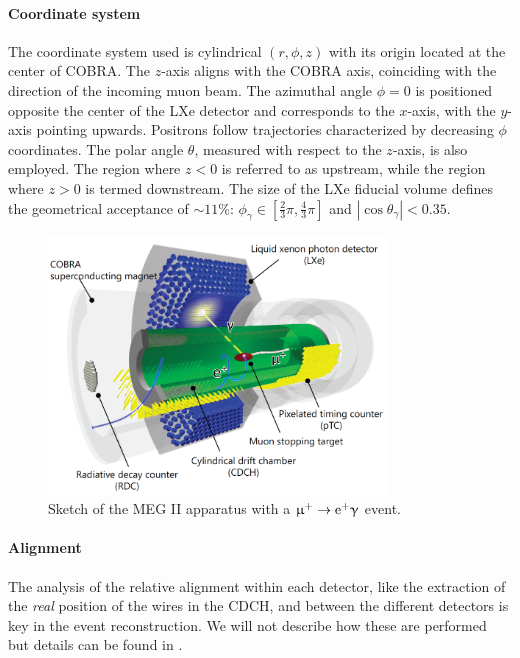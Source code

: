 \begin{refsection}
    \paragraph{Coordinate system}
    The coordinate system used is cylindrical $(r, \phi, z)$ with its origin located at the center of COBRA. 
    The $z$-axis aligns with the COBRA axis, coinciding with the direction of the incoming muon beam. 
    The azimuthal angle $\phi = 0$ is positioned opposite the center of the LXe detector and corresponds to the $x$-axis, with the $y$-axis pointing upwards. 
    Positrons follow trajectories characterized by decreasing $\phi$ coordinates. The polar angle $\theta$, measured with respect to the $z$-axis, is also employed. 
    The region where $z < 0$ is referred to as upstream, while the region where $z > 0$ is termed downstream.
    The size of the LXe fiducial volume defines the geometrical acceptance of $\sim 11\%$: $\phi_\gamma \in [\frac{2}{3}\pi, \frac{4}{3}\pi]$ and $|\cos\theta_\gamma| < 0.35$. 

    \begin{figure}
        \centering
        \includegraphics[width = 0.8\textwidth]{Figures/Introduction/MEG_II.png}
        \caption[MEG II: Sketch of the apparatus]{Sketch of the MEG II apparatus with a $\upmu^+\rightarrow\text{e}^+\upgamma$ event.}
        \label{fig:MEGII}
    \end{figure}

    \paragraph{Alignment} The analysis of the relative alignment within each detector, like the extraction of the \textit{real} position of the wires in the CDCH, and between the different detectors is key in the event reconstruction.
    We will not describe how these are performed but details can be found in \cite{MEG_II:detector}.


\end{refsection}
